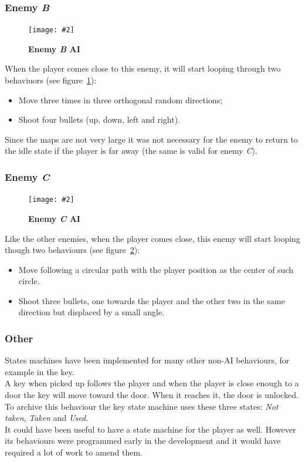 \documentclass[10pt, a4paper]{article}
\newcommand{\figuremacro}[5]{
    \begin{figure}[#1]
        \centering
        \texttt{[image: \#2]}
        \caption[#3]{\textbf{#3}#4}
        \label{fig:#2}
    \end{figure}
}
\begin{document}
    \subsubsection{Enemy \textit{B}}
    \figuremacro{h}{EnemyB}{Enemy \textit{B} AI}{}{1.0}
    When the player comes close to this enemy, it will start looping through two behaviuors (see figure~\ref{fig:EnemyB}):
    \begin{itemize}
    	\item Move three times in three orthogonal random directions;
    	\item Shoot four bullets (up, down, left and right).
    \end{itemize}
	Since the maps are not very large it was not necessary for the enemy to return to the idle state if the player is far away (the same is valid for enemy \textit{C}).
    
    \subsubsection{Enemy \textit{C}}
    \figuremacro{h}{EnemyC}{Enemy \textit{C} AI}{}{1.0}
    Like the other enemies, when the player comes close, this enemy will start looping though two behaviours (see figure~\ref{fig:EnemyC}):
    \begin{itemize}
    	\item Move following a circular path with the player position as the center of such circle.
    	\item Shoot three bullets, one towards the player and the other two in the same direction but displaced by a small angle.
    \end{itemize}
    
    \subsubsection{Other}
    States machines have been implemented for many other non-AI behaviours, for example in the key.\\
    A key when picked up follows the player and when the player is close enough to a door the key will move toward the door. When it reaches it, the door is unlocked. To archive this behaviour the key state machine uses these three states: \textit{Not taken}, \textit{Taken} and \textit{Used}.\\
    It could have been useful to have a state machine for the player as well. However its behaviours were programmed early in the development and it would have required a lot of work to amend them.
    
\end{document}
